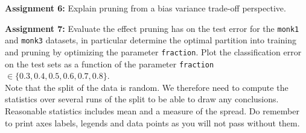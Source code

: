 \documentclass[11pt]{article}
\begin{document}
\begin{tcolorbox}
\textbf{Assignment 6:}
Explain pruning from a bias variance trade-off perspective.
\end{tcolorbox}

\begin{tcolorbox}
\textbf{Assignment 7:} Evaluate the effect pruning has on the test
error for the \texttt{monk1} and \texttt{monk3} datasets, in
particular determine the optimal partition into training and pruning
by optimizing the parameter \texttt{fraction}.  Plot the
classification error on the test sets as a function of the parameter
\texttt{fraction} $\in \{0.3,0.4,0.5,0.6,0.7,0.8\}$. \\

Note that the split of the data is random. We therefore need to compute 
the statistics over several runs of the split to be able to draw any 
conclusions. Reasonable statistics includes mean and a measure of the spread.
Do remember to print axes labels, legends and data points as you will not pass without them.
\end{tcolorbox}
\end{document}
